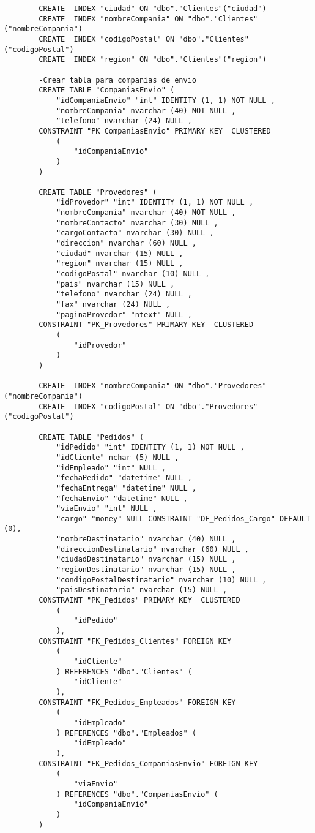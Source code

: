 \documentclass[12pt, letterpaper]{article}
\begin{document}
{\begin{lstlisting}
        CREATE  INDEX "ciudad" ON "dbo"."Clientes"("ciudad")
        CREATE  INDEX "nombreCompania" ON "dbo"."Clientes"("nombreCompania")
        CREATE  INDEX "codigoPostal" ON "dbo"."Clientes"("codigoPostal")
        CREATE  INDEX "region" ON "dbo"."Clientes"("region")

        -Crear tabla para companias de envio
        CREATE TABLE "CompaniasEnvio" (
            "idCompaniaEnvio" "int" IDENTITY (1, 1) NOT NULL ,
            "nombreCompania" nvarchar (40) NOT NULL ,
            "telefono" nvarchar (24) NULL ,
        CONSTRAINT "PK_CompaniasEnvio" PRIMARY KEY  CLUSTERED
            (
                "idCompaniaEnvio"
            )
        )

        CREATE TABLE "Provedores" (
            "idProvedor" "int" IDENTITY (1, 1) NOT NULL ,
            "nombreCompania" nvarchar (40) NOT NULL ,
            "nombreContacto" nvarchar (30) NULL ,
            "cargoContacto" nvarchar (30) NULL ,
            "direccion" nvarchar (60) NULL ,
            "ciudad" nvarchar (15) NULL ,
            "region" nvarchar (15) NULL ,
            "codigoPostal" nvarchar (10) NULL ,
            "pais" nvarchar (15) NULL ,
            "telefono" nvarchar (24) NULL ,
            "fax" nvarchar (24) NULL ,
            "paginaProvedor" "ntext" NULL ,
        CONSTRAINT "PK_Provedores" PRIMARY KEY  CLUSTERED
            (
                "idProvedor"
            )
        )
        
        CREATE  INDEX "nombreCompania" ON "dbo"."Provedores"("nombreCompania")
        CREATE  INDEX "codigoPostal" ON "dbo"."Provedores"("codigoPostal")

        CREATE TABLE "Pedidos" (
            "idPedido" "int" IDENTITY (1, 1) NOT NULL ,
            "idCliente" nchar (5) NULL ,
            "idEmpleado" "int" NULL ,
            "fechaPedido" "datetime" NULL ,
            "fechaEntrega" "datetime" NULL ,
            "fechaEnvio" "datetime" NULL ,
            "viaEnvio" "int" NULL ,
            "cargo" "money" NULL CONSTRAINT "DF_Pedidos_Cargo" DEFAULT (0),
            "nombreDestinatario" nvarchar (40) NULL ,
            "direccionDestinatario" nvarchar (60) NULL ,
            "ciudadDestinatario" nvarchar (15) NULL ,
            "regionDestinatario" nvarchar (15) NULL ,
            "condigoPostalDestinatario" nvarchar (10) NULL ,
            "paisDestinatario" nvarchar (15) NULL ,
        CONSTRAINT "PK_Pedidos" PRIMARY KEY  CLUSTERED
            (
                "idPedido"
            ),
        CONSTRAINT "FK_Pedidos_Clientes" FOREIGN KEY
            (
                "idCliente"
            ) REFERENCES "dbo"."Clientes" (
                "idCliente"
            ),
        CONSTRAINT "FK_Pedidos_Empleados" FOREIGN KEY
            (
                "idEmpleado"
            ) REFERENCES "dbo"."Empleados" (
                "idEmpleado"
            ),
        CONSTRAINT "FK_Pedidos_CompaniasEnvio" FOREIGN KEY
            (
                "viaEnvio"
            ) REFERENCES "dbo"."CompaniasEnvio" (
                "idCompaniaEnvio"
            )
        )
        

\end{lstlisting}}
\end{document}
